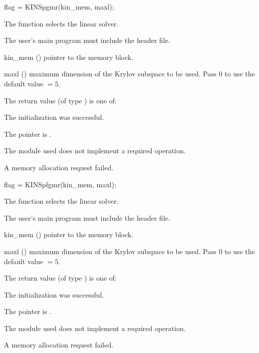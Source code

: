 {
  flag = KINSpgmr(kin\_mem, maxl);
}
{
  The function  selects the {\kinspgmr} linear solver.

  The user's main program must include the  header file.
}
{
  \begin{args}
  \item[kin\_mem] ()
    pointer to the {\kinsol} memory block.
  \item[maxl] ()
    maximum dimension of the Krylov subspace to be used. Pass $0$ to use the 
    default value $=5$.
  \end{args}
}
{
  The return value  (of type ) is one of:
  \begin{args}
  \item[\Id{KINSPILS\_SUCCESS}] 
    The {\kinspgmr} initialization was successful.
  \item[\Id{KINSPILS\_MEM\_NULL}]
    The  pointer is .
  \item[\Id{KINSPILS\_ILL\_INPUT}]
    The {\nvector} module used does not implement a required operation.
  \item[\Id{KINSPILS\_MEM\_FAIL}]
    A memory allocation request failed.
  \end{args}
}
{}
{
  flag = KINSpfgmr(kin\_mem, maxl);
}
{
  The function  selects the {\kinspfgmr} linear solver.

  The user's main program must include the  header file.
}
{
  \begin{args}
  \item[kin\_mem] ()
    pointer to the {\kinsol} memory block.
  \item[maxl] ()
    maximum dimension of the Krylov subspace to be used. Pass $0$ to use the 
    default value $=5$.
  \end{args}
}
{
  The return value  (of type ) is one of:
  \begin{args}
  \item[\Id{KINSPILS\_SUCCESS}] 
    The {\kinspfgmr} initialization was successful.
  \item[\Id{KINSPILS\_MEM\_NULL}]
    The  pointer is .
  \item[\Id{KINSPILS\_ILL\_INPUT}]
    The {\nvector} module used does not implement a required operation.
  \item[\Id{KINSPILS\_MEM\_FAIL}]
    A memory allocation request failed.
  \end{args}
}
